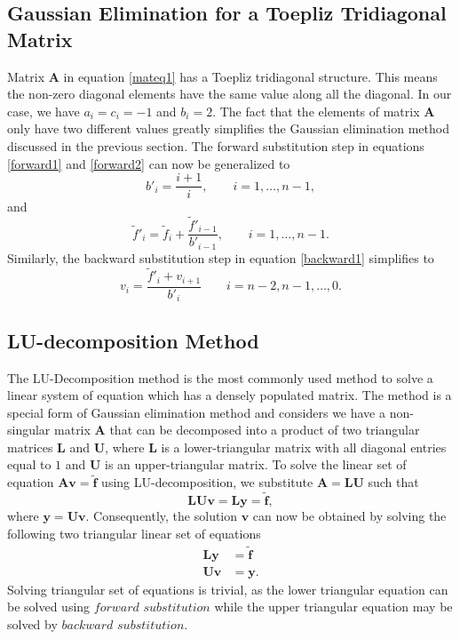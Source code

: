 \documentclass[a4paper]{article}
\begin{document}
\subsection{Gaussian Elimination for a Toepliz Tridiagonal Matrix}
Matrix $\mathbf{A}$ in equation \eqref{mateq1} has a Toepliz tridiagonal structure. This means the non-zero diagonal elements have the same value along all the diagonal. In our case, we have $a_i = c_i = -1$ and $b_i = 2$. The fact that the elements of matrix $\mathbf{A}$ only have two different values greatly simplifies the Gaussian elimination method discussed in the previous section. The forward substitution step in equations \eqref{forward1} and \eqref{forward2} can now be generalized to
\begin{equation}
  b'_i = \frac{i+1}{i}, \qquad i=1,\dots,n-1,
  \label{simple1}
\end{equation}
and
\begin{equation}
  \tilde{f}'_{i} = \tilde{f}_i + \frac{\tilde{f}'_{i-1}}{b'_{i-1}}, \qquad i=1,\dots,n-1.
  \label{simple2}
\end{equation}
Similarly, the backward substitution step in equation \eqref{backward1} simplifies to
\begin{equation}
  v_i = \frac{\tilde{f}'_i +  v_{i+1}}{b'_i} \qquad i=n-2,n-1,\dots,0.
  \label{simple3}
\end{equation}
\subsection{LU-decomposition Method}
The LU-Decomposition method is the most commonly used method to solve a linear system of equation which has a densely populated matrix. The method is a special form of Gaussian elimination method and considers we have a non-singular matrix $\mathbf{A}$ that can be decomposed into a product of two triangular matrices $\mathbf{L}$ and $\mathbf{U}$, where $\mathbf{L}$ is a lower-triangular matrix with all diagonal entries equal to $1$ and $\mathbf{U}$ is an upper-triangular matrix. To solve the linear set of equation $\mathbf{A}\mathbf{v} = \mathbf{\tilde{f}}$ using LU-decomposition, we substitute $\mathbf{A} = \mathbf{L}\mathbf{U}$  such that
\begin{equation} 
 \mathbf{L}\mathbf{U}\mathbf{v} = \mathbf{L}\mathbf{y} = \mathbf{\tilde{f}},
 \label{lu1}
\end{equation}
where $\mathbf{y}=\mathbf{U}\mathbf{v}$. Consequently, the solution $\mathbf{v}$ can now be obtained by solving the following two triangular linear set of equations
\begin{equation} 
\begin{split}
 \mathbf{L}\mathbf{y} &= \mathbf{\tilde{f}} \\
 \mathbf{U}\mathbf{v} &= \mathbf{y}.
\end{split}
 \label{lu2}
\end{equation}
Solving triangular set of equations is trivial, as the lower triangular equation can be solved using $forward$ $substitution$ while the upper triangular equation may be solved by $backward$ $substitution$.
\end{document}

